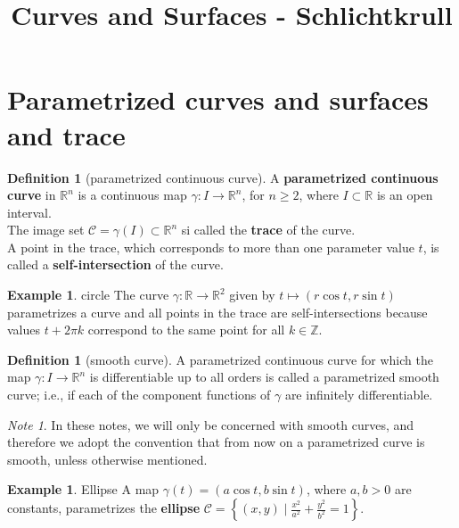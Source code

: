 \documentclass[reqno]{amsart}
\title{Curves and Surfaces - Schlichtkrull}
\date{}
\theoremstyle{plain}%
\theoremstyle{definition}
\newtheorem{definition}[theorem]{Definition}
\newtheorem{example}[theorem]{Example}
\theoremstyle{remark}
\newtheorem*{note}{Note}
\begin{document}
\maketitle
\section{Parametrized curves and surfaces and trace}
    \begin{definition}[parametrized continuous curve]
        A \textbf{parametrized continuous curve} in $\mathbb{R}^{n}$ is
        a continuous map $\gamma  \colon I \to \mathbb{R}^{n}$, for $n\ge 2$, where
        $I \subset \mathbb{R}$ is an open interval.\\
        The image set $\mathcal{C} = \gamma (I) \subset \mathbb{R}^{n}$ si
        called the \textbf{trace} of the curve.\\
        A point in the trace, which corresponds to more than one parameter value
        $t$, is called a \textbf{self-intersection} of the curve.
    \end{definition}
    \begin{example}{circle}
        The curve $\gamma  \colon \mathbb{R} \to \mathbb{R}^2$ given by
        $t\mapsto \left( r \cos t, r \sin t \right) $ parametrizes a curve and
        all points in the trace are self-intersections because values 
        $t+ 2 \pi k$ correspond to the same point for all $k \in \mathbb{Z}$.
    \end{example}
    \begin{definition}[smooth curve]
        A parametrized continuous curve for which the map
        $\gamma  \colon I \to \mathbb{R}^{n}$ is differentiable up to all
        orders is called a parametrized smooth curve; i.e., if each of the
        component functions of $\gamma$ are infinitely differentiable.
    \end{definition}
    \begin{note}
        In these notes, we will only be concerned with smooth curves, and
        therefore we adopt the convention that from now on a parametrized curve
        is smooth, unless otherwise mentioned.
    \end{note}
    \begin{example}{Ellipse}
        A map $\gamma (t) = \left( a \cos t, b \sin t \right) $, where 
        $a,b > 0$ are constants, parametrizes the \textbf{ellipse}
        $\mathcal{C} = \left\{ \left( x,y \right)  \mid 
        \frac{x^2}{a^2} + \frac{y^2}{b^2} = 1\right\} $.
    \end{example}
\end{document}
